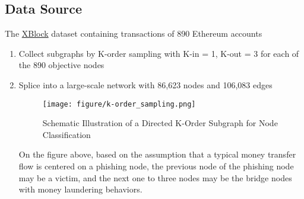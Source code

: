 \documentclass[article,36pt,extrafontsizes,oneside,openany,oldfontcommands]{memoir}
\begin{document}
\begin{adjmulticols*}{3}{0.5in}{0.5in}
\section{Data Source}
\begin{adjustwidth}{0.1in}{0in}
The \href{http://xblock.pro/#/dataset/6}{XBlock} dataset containing transactions of 890 Ethereum accounts
\begin{enumerate}[topsep=0pt,itemsep=0ex,partopsep=0ex,parsep=0ex]
\item Collect subgraphs by K-order sampling with K-in = 1, K-out = 3 for each of the 890 objective nodes 
\item Splice into a large-scale network with 86,623 nodes and 106,083 edges
\begin{figure}
	\centering
	\texttt{[image: figure/k-order\_sampling.png]}
	\caption{Schematic Illustration of a Directed K-Order Subgraph for Node Classification}
\end{figure}
On the figure above, based on the assumption that a typical money transfer flow is centered on a phishing node, the previous node of the phishing node may be a victim, and the next one to three nodes may be the bridge nodes with money laundering behaviors.

\end{enumerate}
\end{adjustwidth}


\end{adjmulticols*}
\end{document}
